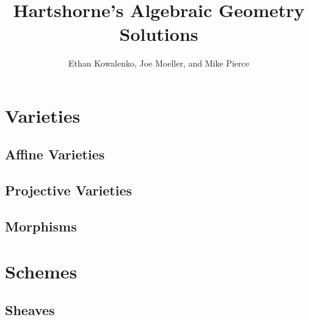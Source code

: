 




\title{Hartshorne's Algebraic Geometry Solutions}
\author{Ethan Kowalenko, Joe Moeller, and Mike Pierce}
\date{}



\maketitle

\section{Varieties}

\subsection{Affine Varieties}

\subsection{Projective Varieties}

\subsection{Morphisms}


\section{Schemes}

\subsection{Sheaves}






